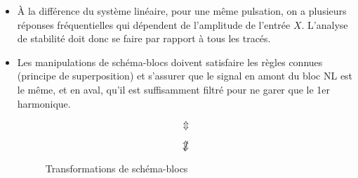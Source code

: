 \documentclass[main.tex]{subfiles}
\begin{document}
\begin{rem}
\begin{itemize}
\item À la différence du système linéaire, pour une même pulsation, on a plusieurs réponses fréquentielles qui dépendent de l'amplitude de l'entrée $X$. L'analyse de stabilité doit donc se faire par rapport à tous les tracés.


\item Les manipulations de schéma-blocs doivent satisfaire les règles connues (principe de superposition) et s'assurer que le signal en amont du bloc NL est le même, et en aval, qu'il est suffisamment filtré pour ne garer que le 1er harmonique.

\begin{example}
\begin{figure}[h!]
\centering
{}
\[
\Updownarrow
\]
\[
 \Updownarrow\hspace{-0.8em}/
\]
\caption{Transformations de schéma-blocs}
\end{figure}

\end{example}
\end{itemize}
\end{rem}
\end{document}

